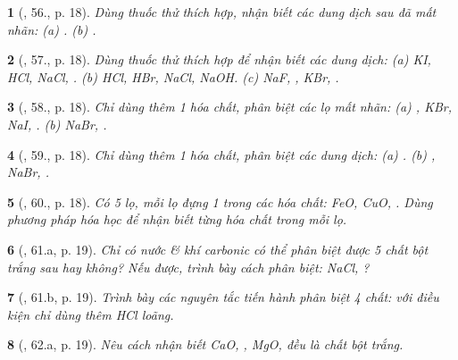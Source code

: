 \documentclass{article}
\newtheorem{baitoan}{}
\begin{document}
\begin{baitoan}[\cite{An_400_BT_Hoa_Hoc_9}, 56., p. 18]
	Dùng thuốc thử thích hợp, nhận biết các dung dịch sau đã mất nhãn: {\rm(a) . (b) }.
\end{baitoan}

\begin{baitoan}[\cite{An_400_BT_Hoa_Hoc_9}, 57., p. 18]
	Dùng thuốc thử thích hợp để nhận biết các dung dịch: {\rm(a) KI, HCl, NaCl, . (b) HCl, HBr, NaCl, NaOH. (c) NaF, , KBr, }.
\end{baitoan}

\begin{baitoan}[\cite{An_400_BT_Hoa_Hoc_9}, 58., p. 18]
	Chỉ dùng thêm 1 hóa chất, phân biệt các lọ mất nhãn: {\rm(a) , KBr, NaI, . (b) NaBr, }.
\end{baitoan}

\begin{baitoan}[\cite{An_400_BT_Hoa_Hoc_9}, 59., p. 18]
	Chỉ dùng thêm 1 hóa chất, phân biệt các dung dịch: {\rm(a) . (b) , NaBr, }.
\end{baitoan}

\begin{baitoan}[\cite{An_400_BT_Hoa_Hoc_9}, 60., p. 18]
	Có 5 lọ, mỗi lọ đựng 1 trong các hóa chất: {\rm FeO, CuO, }. Dùng phương pháp hóa học để nhận biết từng hóa chất trong mỗi lọ.
\end{baitoan}

\begin{baitoan}[\cite{An_400_BT_Hoa_Hoc_9}, 61.a, p. 19]
	Chỉ có nước \& khí carbonic có thể phân biệt được 5 chất bột trắng sau hay không? Nếu được, trình bày cách phân biệt: {\rm NaCl, }? 
\end{baitoan}

\begin{baitoan}[\cite{An_400_BT_Hoa_Hoc_9}, 61.b, p. 19]
	Trình bày các nguyên tắc tiến hành phân biệt 4 chất: {\rm{}} với điều kiện chỉ dùng thêm {\rm HCl} loãng.
\end{baitoan}

\begin{baitoan}[\cite{An_400_BT_Hoa_Hoc_9}, 62.a, p. 19]
	Nêu cách nhận biết {\rm CaO, , MgO, } đều là chất bột trắng.
\end{baitoan}
\end{document}
